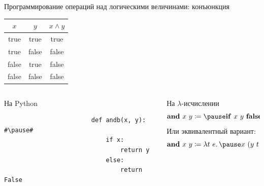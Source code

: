     \begin{frame}[fragile]{Программирование операций над логическими величинами: конъюнкция}
        \begin{center}
            \begin{tabular}{|c|c|c|}
                \hline
                $x$   & $y$   & $x \land y$ \\ \hline
                true  & true  & true        \\
                true  & false & false       \\
                false & true  & false       \\
                false & false & false       \\ \hline
            \end{tabular}
        \end{center}
        \begin{columns}[onlytextwidth]
            \begin{column}[t]{0.485\textwidth}
                \begin{block}{На Python}
                    \begin{verbatim}
                        def andb(x, y): #\pause#
                            if x:
                                return y
                            else:
                                return False
                    \end{verbatim}
                \end{block}
            \end{column}\hfill
            \pause%
            \begin{column}[t]{0.485\textwidth}
                \begin{block}{На $\lambda$-исчислении}
                    \[
                        \term{and} ~x~y \termdef \pause \term{if} \ap x \ap y \ap \term{false}
                    \]
                    \pause
                    Или эквивалентный вариант:
                    \[\term{and}~x~y \termdef \lambda t~e\ldotp \pause x~(y~t~e)~e\]
                    \vspace{-1em}
                \end{block}
            \end{column}
        \end{columns}
    \end{frame}


